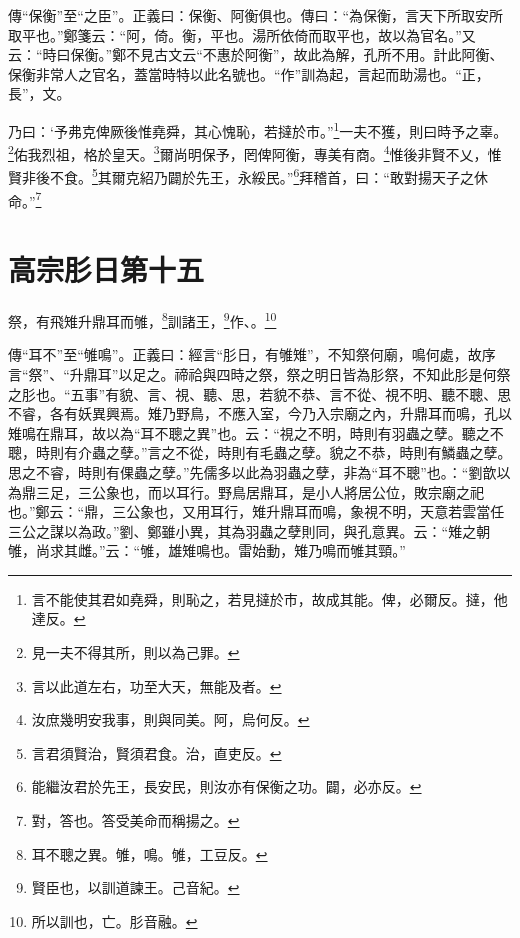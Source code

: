 {\noindent\zhuan{}\fzbyks 傳“保衡”至“之臣”。正義曰：保衡、阿衡俱也。傳曰：“為保衡，言天下所取安所取平也。”鄭箋云：“阿，倚。衡，平也。湯所依倚而取平也，故以為官名。”又云：“時曰保衡。”鄭不見古文云“不惠於阿衡”，故此為解，孔所不用。計此阿衡、保衡非常人之官名，蓋當時特以此名號也。“作”訓為起，言起而助湯也。“正，長”，文。 \par}

乃曰：‘予弗克俾厥後惟堯舜，其心愧恥，若撻於市。”\footnote{言不能使其君如堯舜，則恥之，若見撻於市，故成其能。俾，必爾反。撻，他達反。}一夫不獲，則曰時予之辜。\footnote{見一夫不得其所，則以為己罪。}佑我烈祖，格於皇天。\footnote{言以此道左右，功至大天，無能及者。}爾尚明保予，罔俾阿衡，專美有商。\footnote{汝庶幾明安我事，則與同美。阿，烏何反。}惟後非賢不乂，惟賢非後不食。\footnote{言君須賢治，賢須君食。治，直吏反。}其爾克紹乃闢於先王，永綏民。”\footnote{能繼汝君於先王，長安民，則汝亦有保衡之功。闢，必亦反。}拜稽首，曰：“敢對揚天子之休命。”\footnote{對，答也。答受美命而稱揚之。}

\section{高宗肜日第十五}


祭，有飛雉升鼎耳而雊，\footnote{耳不聰之異。雊，鳴。雊，工豆反。}訓諸王，\footnote{賢臣也，以訓道諫王。己音紀。}作、。\footnote{所以訓也，亡。肜音融。}


{\noindent\zhuan{}\fzbyks 傳“耳不”至“雊鳴”。正義曰：經言“肜日，有雊雉”，不知祭何廟，鳴何處，故序言“祭”、“升鼎耳”以足之。禘祫與四時之祭，祭之明日皆為肜祭，不知此肜是何祭之肜也。“五事”有貌、言、視、聽、思，若貌不恭、言不從、視不明、聽不聰、思不睿，各有妖異興焉。雉乃野鳥，不應入室，今乃入宗廟之內，升鼎耳而鳴，孔以雉鳴在鼎耳，故以為“耳不聰之異”也。云：“視之不明，時則有羽蟲之孽。聽之不聰，時則有介蟲之孽。”言之不從，時則有毛蟲之孽。貌之不恭，時則有鱗蟲之孽。思之不睿，時則有倮蟲之孽。”先儒多以此為羽蟲之孽，非為“耳不聰”也。：“劉歆以為鼎三足，三公象也，而以耳行。野鳥居鼎耳，是小人將居公位，敗宗廟之祀也。”鄭云：“鼎，三公象也，又用耳行，雉升鼎耳而鳴，象視不明，天意若雲當任三公之謀以為政。”劉、鄭雖小異，其為羽蟲之孽則同，與孔意異。云：“雉之朝雊，尚求其雌。”云：“雊，雄雉鳴也。雷始動，雉乃鳴而雊其頸。” \par}

